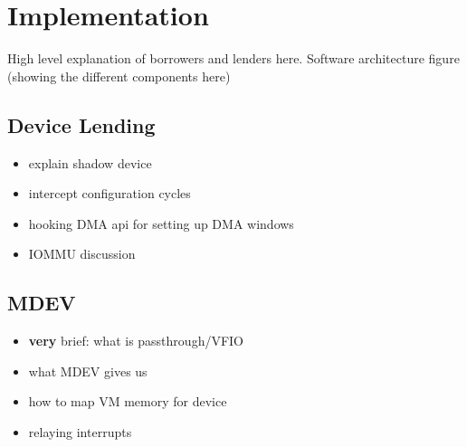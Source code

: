 \section{Implementation}\label{sec:impl}
High level explanation of borrowers and lenders here.
Software architecture figure (showing the different components here)

\subsection{Device Lending}
\begin{itemize}
    \item explain shadow device
    \item intercept configuration cycles
    \item hooking DMA api for setting up DMA windows
    \item IOMMU discussion
\end{itemize}

\subsection{MDEV}
\begin{itemize}
    \item \textbf{very} brief: what is passthrough/VFIO
    \item what MDEV gives us
    \item how to map VM memory for device
    \item relaying interrupts
\end{itemize}

